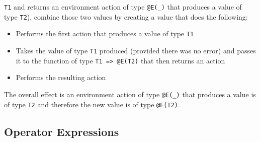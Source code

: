 \documentclass[diploma]{softlab-thesis}
\begin{document}
\verb|T1| and returns an environment action of type \verb|@E(_)| that produces
a value of type \verb|T2|), combine those two values by creating a value that
does the following:
\begin{itemize}
\item
Performs the first action that produces a value of type \verb|T1|

\item
Takes the value of type \verb|T1| produced (provided there was no error) and
passes it to the function of type \verb|T1 => @E(T2)| that then returns an
action

\item
Performs the resulting action
\end{itemize}
The overall effect is an environment action  of type \verb|@E(_)| that produces
a value is of type \verb|T2| and therefore the new value is of type
\verb|@E(T2)|.

\newpage

\subsection{Operator Expressions}
\end{document}
